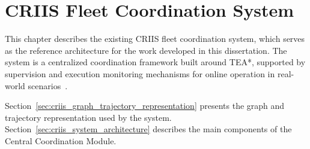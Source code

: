 \chapter{CRIIS Fleet Coordination System}
\label{chap:ch4}
\hspace{\parindent}
This chapter describes the existing CRIIS fleet coordination system, which serves as the reference
architecture for the work developed in this dissertation. The system is a centralized coordination
framework built around TEA*, supported by supervision and execution monitoring
mechanisms for online operation in real-world scenarios~\cite{matos2025criis}.

Section~\ref{sec:criis_graph_trajectory_representation} presents the graph and trajectory
representation used by the system. Section~\ref{sec:criis_system_architecture} describes the
main components of the Central Coordination Module.



